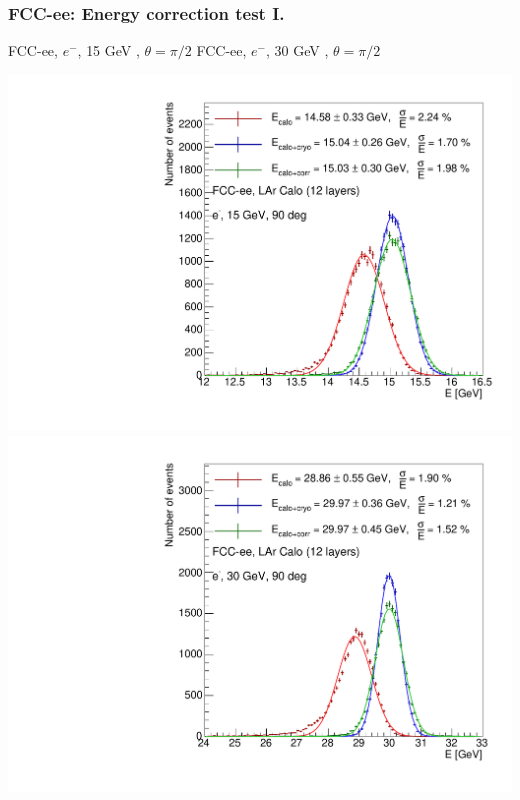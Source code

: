 \documentclass{beamer}
\newcommand{\redtext}[1]{%
  \textcolor{myRed}{#1}
}
\begin{document}
\begin{frame}
  \frametitle{FCC-ee: Energy correction test I.}

  \centering
  FCC-ee, $e^{-}$, \redtext{15 GeV}, $\theta = \pi/2$ \hspace{8mm}
  FCC-ee, $e^{-}$, \redtext{30 GeV}, $\theta = \pi/2$ \\[1.5ex]
  \begin{adjustwidth}{-9mm}{-9mm}
    \includegraphics[width=0.49\linewidth]{figures/12layers/hist_energy_corr_validation_90deg_15GeV.pdf}
    \includegraphics[width=0.49\linewidth]{figures/12layers/hist_energy_corr_validation_90deg_30GeV.pdf}
  \end{adjustwidth}
\end{frame}
\end{document}
